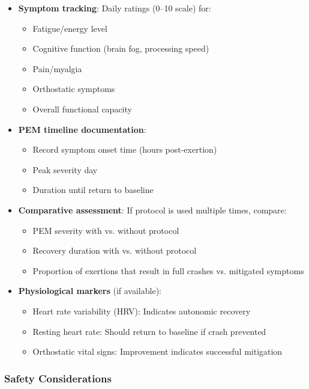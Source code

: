 \begin{itemize}
    \item \textbf{Symptom tracking}: Daily ratings (0--10 scale) for:
    \begin{itemize}
        \item Fatigue/energy level
        \item Cognitive function (brain fog, processing speed)
        \item Pain/myalgia
        \item Orthostatic symptoms
        \item Overall functional capacity
    \end{itemize}

    \item \textbf{PEM timeline documentation}:
    \begin{itemize}
        \item Record symptom onset time (hours post-exertion)
        \item Peak severity day
        \item Duration until return to baseline
    \end{itemize}

    \item \textbf{Comparative assessment}: If protocol is used multiple times, compare:
    \begin{itemize}
        \item PEM severity with vs. without protocol
        \item Recovery duration with vs. without protocol
        \item Proportion of exertions that result in full crashes vs. mitigated symptoms
    \end{itemize}

    \item \textbf{Physiological markers} (if available):
    \begin{itemize}
        \item Heart rate variability (HRV): Indicates autonomic recovery
        \item Resting heart rate: Should return to baseline if crash prevented
        \item Orthostatic vital signs: Improvement indicates successful mitigation
    \end{itemize}
\end{itemize}

\subsubsection{Safety Considerations}

